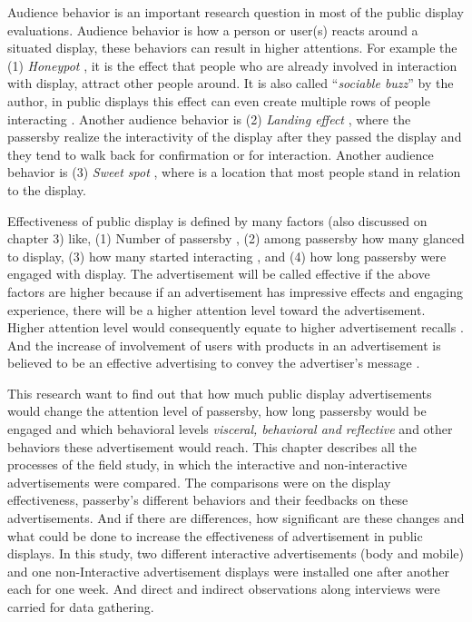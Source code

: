Audience behavior is an important research question in most of the public display evaluations. Audience behavior is how a person or user(s) reacts around a situated display, these behaviors can result in higher attentions. For example the (1) \emph{Honeypot} \cite{EnticingPeople}, it is the effect that people who are already involved in interaction with display, attract other people around. It is also called ``\emph{sociable buzz}'' by the author, in public displays this effect can even create multiple rows of people interacting \cite{LookingGlass}. Another audience behavior is (2) \emph{Landing effect} \cite{LookingGlass}, where the passersby realize the interactivity of the display after they passed the display and they tend to walk back for confirmation or for interaction. Another audience behavior is (3) \emph {Sweet spot} \cite{CylindricalScreen}, where is a location that most people stand in relation to the display.




Effectiveness of public display is defined by many factors (also discussed on chapter 3) like, (1) Number of passersby \cite{glancingcount, digitalSignage}, (2) among passersby how many glanced \cite{glancingcount, When_display, display_blindness} to display, (3) how many started interacting \cite{LookingGlass, glancingcount}, and (4) how long passersby were engaged with display. The advertisement will be called effective if the above factors are higher because if an advertisement has impressive effects and engaging experience, there will be a higher attention level toward the advertisement. Higher attention level would consequently equate to higher advertisement recalls \cite{add_effectivenss}. And the increase of involvement of users with products in an advertisement is believed to be an effective advertising to convey the advertiser’s message \cite{audience_involvement}.  

This research want to find out that how much public display advertisements would change the attention level of passersby, how long passersby would be engaged and which behavioral levels \emph{visceral, behavioral and reflective } and other behaviors these advertisement would reach. This chapter describes all the processes of the field study, in which the interactive and non-interactive advertisements were compared. The comparisons were on the display effectiveness, passerby’s different behaviors and their feedbacks on these advertisements. And if there are differences, how significant are these changes and what could be done to increase the effectiveness of advertisement in public displays.  In this study, two different interactive advertisements (body and mobile) and one non-Interactive advertisement displays were installed one after another each for one week. And direct and indirect observations along interviews were carried for data gathering.




